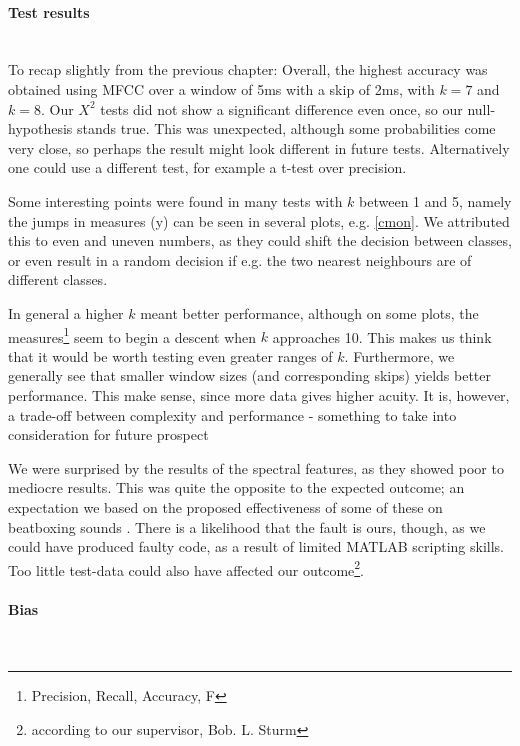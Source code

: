 \paragraph{Test results} \hspace{0pt} \\

To recap slightly from the previous chapter: Overall, the highest accuracy was obtained using MFCC over a window of 5ms with a skip of 2ms, with $k=7$ and $k=8$. Our $X^2$ tests did not show a significant difference even once, so our null-hypothesis stands true. This was unexpected, although some probabilities come very close, so perhaps the result might look different in future tests. Alternatively one could use a different test, for example a t-test over precision.

Some interesting points were found in many tests with $k$ between 1 and 5, namely the jumps in measures (y) can be seen in several plots, e.g. \ref{cmon}. We attributed this to even and uneven numbers, as they could shift the decision between classes, or even result in a random decision if e.g. the two nearest neighbours are of different classes.

In general a higher $k$ meant better performance, although on some plots, the measures\footnote{Precision, Recall, Accuracy, F} seem to begin a descent when $k$ approaches 10. This makes us think that it would be worth testing even greater ranges of $k$. 
Furthermore, we generally see that smaller window sizes (and corresponding skips) yields better performance. This make sense, since more data gives higher acuity. It is, however, a trade-off between complexity and performance - something to take into consideration for future prospect

We were surprised by the results of the spectral features, as they showed poor to mediocre results. This was quite the opposite to the expected outcome; an expectation we based on the proposed effectiveness of some of these on beatboxing sounds \citep{Sinyor05}. There is a likelihood that the fault is ours, though, as we could have produced faulty code, as a result of limited MATLAB scripting skills. Too little test-data could also have affected our outcome\footnote{according to our supervisor, Bob. L. Sturm}.


\paragraph{Bias} \hspace{0pt} \\

